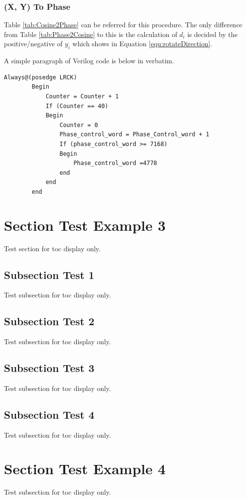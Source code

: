 \subsubsection{(X, Y) To Phase}
Table \ref{tab:Cosine2Phase} can be referred for this procedure. The only difference from Table \ref{tab:Phase2Cosine} to this is the calculation of $d_i$ is decided by the positive/negative of $y_i$ which shows in Equation \ref{equ:rotateDirection}.
 




A simple paragraph of Verilog code is below in verbatim.
\begin{verbatim}
Always@(posedge LRCK)
        Begin
        	Counter = Counter + 1
        	If (Counter == 40)
        	Begin
         		Counter = 0
	        	Phase_control_word = Phase_Control_word + 1
         		If (phase_control_word >= 7168)
         		Begin
	         		Phase_control_word =4778
		        end
        	end
        end
\end{verbatim}

\section{Section Test Example 3}
Test section for toc display only.

\subsection{Subsection Test 1}
Test subsection for toc display only.

\subsection{Subsection Test 2}
Test subsection for toc display only.

\subsection{Subsection Test 3}

Test subsection for toc display only.

\subsection{Subsection Test 4}

Test subsection for toc display only.

\section{Section Test Example 4}
Test subsection for toc display only.

